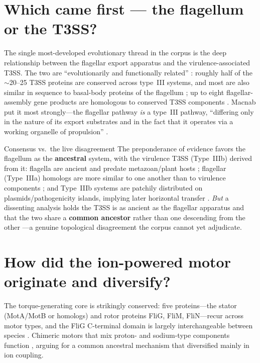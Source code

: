 \documentclass[11pt,letterpaper]{article}
\begin{document}
\section{Which came first --- the flagellum or the T3SS?}
The single most-developed evolutionary thread in the corpus is the deep relationship between the
flagellar export apparatus and the virulence-associated T3SS. The two are ``evolutionarily and
functionally related'' \cite{Erhardt-2014}: roughly half of the $\sim$20--25 T3SS proteins
are conserved across type~III systems, and most are also similar in sequence to basal-body proteins of
the flagellum \cite{Ghosh-2004}; up to eight flagellar-assembly gene products are
homologous to conserved T3SS components \cite{Stephens-1996}. Macnab put it most
strongly---the flagellar pathway \emph{is} a type~III pathway, ``differing only in the nature of its
export substrates and in the fact that it operates via a working organelle of propulsion''
\cite{Macnab-1999}.

\begin{keybox}{Consensus vs.\ the live disagreement}
The preponderance of evidence favors the flagellum as the \textbf{ancestral} system, with the
virulence T3SS (Type~IIIb) derived from it: flagella are ancient and predate metazoan/plant hosts
\cite{Stephens-1996,Macnab-1999}; flagellar (Type~IIIa) homologs are more similar to
one another than to virulence components \cite{Stephens-1996}; and Type~IIIb systems are
patchily distributed on plasmids/pathogenicity islands, implying later horizontal transfer
\cite{Stephens-1996}. \emph{But} a dissenting analysis holds the T3SS is as ancient as the
flagellar apparatus and that the two share a \textbf{common ancestor} rather than one descending from
the other \cite{Ghosh-2004}---a genuine topological disagreement the corpus cannot yet
adjudicate.
\end{keybox}

\section{How did the ion-powered motor originate and diversify?}
The torque-generating core is strikingly conserved: five proteins---the stator (MotA/MotB or homologs)
and rotor proteins FliG, FliM, FliN---recur across motor types, and the FliG C-terminal domain is
largely interchangeable between species \cite{Yakushi-2006}. Chimeric motors that mix
proton- and sodium-type components function \cite{Sowa-2008-c}, arguing for a common
ancestral mechanism that diversified mainly in ion coupling.
\end{document}
